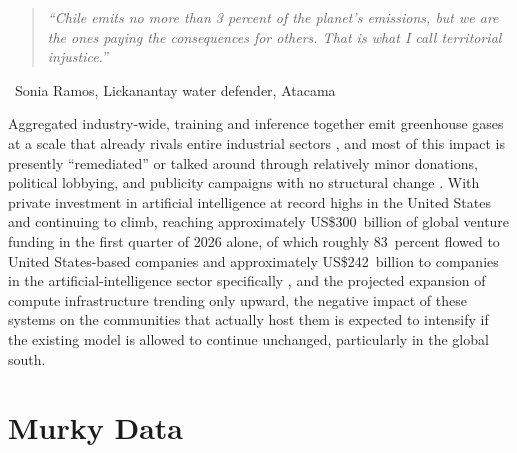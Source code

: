 \documentclass[10pt,a4paper,twocolumn]{article}
\begin{document}
\begin{quote}
\itshape\small ``Chile emits no more than 3 percent of the planet's emissions, but we are the ones paying the consequences for others. That is what I call territorial injustice.''
\end{quote}
\noindent\hspace*{1em}\textemdash\ Sonia Ramos, Lickanantay water defender, Atacama \citep{iied2024ramos}
\smallskip

Aggregated industry-wide, training and inference together emit greenhouse gases at a scale that already rivals entire industrial sectors \citep{strubell2019energy}, and most of this impact is presently ``remediated'' or talked around through relatively minor donations, political lobbying, and publicity campaigns with no structural change \citep[ch.~12]{hao2025empire}. With private investment in artificial intelligence at record highs in the United States and continuing to climb, reaching approximately US\$300~billion of global venture funding in the first quarter of 2026 alone, of which roughly 83~percent flowed to United States-based companies and approximately US\$242~billion to companies in the artificial-intelligence sector specifically \citep{crunchbase2026q1,stanfordhai2025index}, and the projected expansion of compute infrastructure trending only upward, the negative impact of these systems on the communities that actually host them is expected to intensify if the existing model is allowed to continue unchanged, particularly in the global south.

\section{Murky Data}
\label{sec:murky-data}
\end{document}
